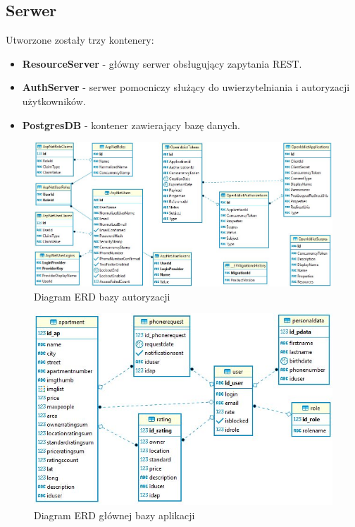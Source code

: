 \documentclass[polish, 11pt]{article}
\begin{document}
    \subsection{Serwer}
        Utworzone zostały trzy kontenery:
        \begin{itemize}
            \item \textbf{ResourceServer} - główny serwer obsługujący zapytania REST.\\
            
            \item \textbf{AuthServer} - serwer pomocniczy służący do uwierzytelniania i autoryzacji użytkowników.\\
            
            \item \textbf{PostgresDB} - kontener zawierający bazę danych.\\
        
        \end{itemize}
        
        
        \begin{figure}[H]
            \centering
            \includegraphics[width=\textwidth]{figures/AuthERD.jpg}
            \caption{Diagram ERD bazy autoryzacji}
        \end{figure}
        
        \begin{figure}[H]
            \centering
            \includegraphics[width=\textwidth]{figures/TrueHomeERD.jpg}
            \caption{Diagram ERD głównej bazy aplikacji}
        \end{figure}
        
\end{document}
